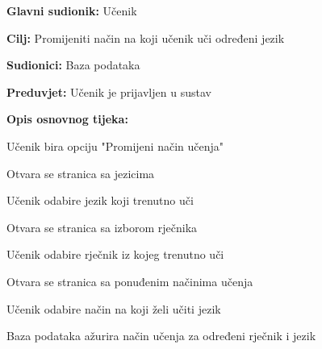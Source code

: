 					\noindent {}
					\begin{packed_item}
	
						\item \textbf{Glavni sudionik: }Učenik
						\item  \textbf{Cilj:} Promijeniti način na koji učenik uči određeni jezik
						\item  \textbf{Sudionici:} Baza podataka
						\item  \textbf{Preduvjet:} Učenik je prijavljen u sustav
						\item  \textbf{Opis osnovnog tijeka:}
						
						\item[] \begin{packed_enum}
	
							\item Učenik bira opciju "Promijeni način učenja"
							\item Otvara se stranica sa jezicima
							\item Učenik odabire jezik koji trenutno uči
							\item Otvara se stranica sa izborom rječnika
							\item Učenik odabire rječnik iz kojeg trenutno uči
							\item Otvara se stranica sa ponuđenim načinima učenja
							\item Učenik odabire način na koji želi učiti jezik
							\item Baza podataka ažurira način učenja za određeni rječnik i jezik
						\end{packed_enum}
						
					\end{packed_item}

